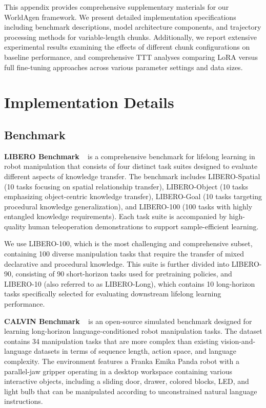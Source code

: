 This appendix provides comprehensive supplementary materials for our WorldAgen framework. We present detailed implementation specifications including benchmark descriptions, model architecture components, and trajectory processing methods for variable-length chunks. Additionally, we report extensive experimental results examining the effects of different chunk configurations on baseline performance, and comprehensive TTT analyses comparing LoRA \citep{hu2022lora} versus full fine-tuning approaches across various parameter settings and data sizes.


\section{Implementation Details}
\subsection{Benchmark}

\textbf{LIBERO Benchmark} ~\citep{liu2023libero} is a comprehensive benchmark for lifelong learning in robot manipulation that consists of four distinct task suites designed to evaluate different aspects of knowledge transfer. The benchmark includes LIBERO-Spatial (10 tasks focusing on spatial relationship transfer), LIBERO-Object (10 tasks emphasizing object-centric knowledge transfer), LIBERO-Goal (10 tasks targeting procedural knowledge generalization), and LIBERO-100 (100 tasks with highly entangled knowledge requirements). Each task suite is accompanied by high-quality human teleoperation demonstrations to support sample-efficient learning.

We use LIBERO-100, which is the most challenging and comprehensive subset, containing 100 diverse manipulation tasks that require the transfer of mixed declarative and procedural knowledge. This suite is further divided into LIBERO-90, consisting of 90 short-horizon tasks used for pretraining policies, and LIBERO-10 (also referred to as LIBERO-Long), which contains 10 long-horizon tasks specifically selected for evaluating downstream lifelong learning performance.

\textbf{CALVIN Benchmark} ~\citep{mees2022calvin} is an open-source simulated benchmark designed for learning long-horizon language-conditioned robot manipulation tasks. The dataset contains 34 manipulation tasks that are more complex than existing vision-and-language datasets in terms of sequence length, action space, and language complexity. The environment features a Franka Emika Panda robot with a parallel-jaw gripper operating in a desktop workspace containing various interactive objects, including a sliding door, drawer, colored blocks, LED, and light bulb that can be manipulated according to unconstrained natural language instructions.


